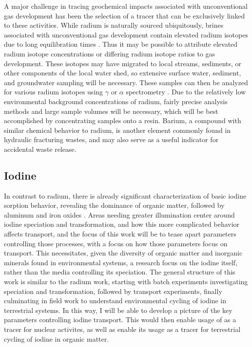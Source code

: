 \documentclass[twoside,12pt,titlepage]{article}
\newcommand{\isotope}[2]{\ch{^{#1}#2}}
\begin{document}
\par A major challenge in tracing geochemical impacts associated with unconventional gas development has been the selection of a tracer that can be exclusively linked to these activities. While radium is naturally sourced ubiquitously, brines associated with unconventional gas development contain elevated radium isotopes due to long equilibration times \cite{Barbot2013}. Thus it may be possible to attribute elevated radium isotope concentrations or differing radium isotope ratios to gas development. These isotopes may have migrated to local streams, sediments, or other components of the local water shed, so extensive surface water, sediment, and groundwater sampling will be necessary. These samples can then be analyzed for various radium isotopes using $\gamma$ or $\alpha$ spectrometry \cite{Elsinger1982,Bojanowski2005}. Due to the relatively low environmental background concentrations of radium, fairly precise analysis methods and large sample volumes will be necessary, which will be best accomplished by concentrating samples onto a resin. Barium, a compound with similar chemical behavior to radium, is another element commonly found in hydraulic fracturing wastes, and may also serve as a useful indicator for accidental waste release.

\subsection{Iodine}

In contrast to radium, there is already significant characterization of basic iodine sorption behavior, revealing the dominance of organic matter, followed by aluminum and iron oxides \cite{Kaplan2014}. Areas needing greater illumination center around iodine speciation and transformation, and how this more complicated behavior affects transport, and the focus of this work will be to tease apart parameters controlling those processes, with a focus on how those parameters focus on transport. This necessitates, given the diversity of organic matter and inorganic minerals found in environmental systems, a research focus on the iodine itself, rather than the media controlling its speciation. The general structure of this work is similar to the radium work, starting with batch experiments investigating speciation and transformation, followed by transport experiments, finally culminating in field work to understand environmental cycling of iodine in terrestrial systems. In this way, I will be able to develop a picture of the key parameters controlling iodine transport. This would then enable usage of \isotope{129}{I} as a tracer for nuclear activites, as well as enable its usage as a tracer for terrestrial cycling of iodine in organic matter.
\end{document}

